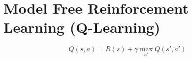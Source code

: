 \section{Model Free Reinforcement Learning (Q-Learning)}

  \begin{equation}
    Q\left( s, a \right) = R\left( s \right) + \gamma \max_{a'} Q\left( s', a' \right)
  \end{equation}